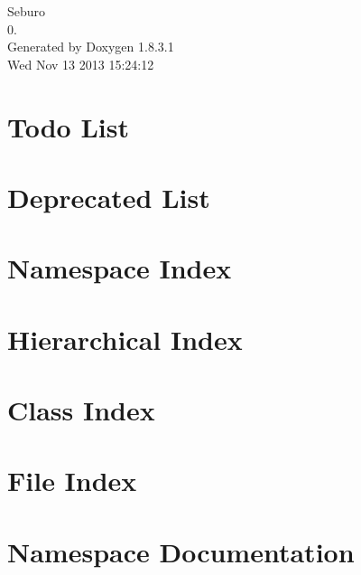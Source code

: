 \documentclass{book}
\begin{document}
\hypersetup{pageanchor=false,citecolor=blue}
\begin{titlepage}
\vspace*{7cm}
\begin{center}
{\Large Seburo \\[1ex]\large 0. }\\
\vspace*{1cm}
{\large Generated by Doxygen 1.8.3.1}\\
\vspace*{0.5cm}
{\small Wed Nov 13 2013 15:24:12}\\
\end{center}
\end{titlepage}
\clearemptydoublepage
{}
\tableofcontents
\clearemptydoublepage
{}
\hypersetup{pageanchor=true,citecolor=blue}
\chapter{Todo List}
\label{todo}
\hypertarget{todo}{}

\chapter{Deprecated List}
\label{deprecated}
\hypertarget{deprecated}{}

\chapter{Namespace Index}

\chapter{Hierarchical Index}

\chapter{Class Index}

\chapter{File Index}

\chapter{Namespace Documentation}

\end{document}
